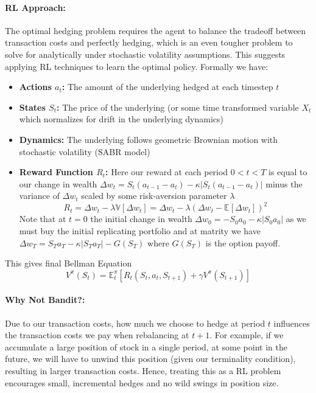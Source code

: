 \documentclass{article}
\begin{document}
\paragraph{RL Approach:} The optimal hedging problem requires the agent to balance the tradeoff between transaction costs and perfectly hedging, which is an even tougher problem to solve for analytically under stochastic volatility assumptions. This suggests applying RL techniques to learn the optimal policy. Formally we have: 
\begin{itemize}
    \item \textbf{Actions $a_t$:} The amount of the underlying hedged at each timestep $t$\cite{halperin}\cite{stoiljkovic}
    \item \textbf{States $S_t$:} The price of the underlying (or some time transformed variable $X_t$ which normalizes for drift in the underlying dynamics)\cite{halperin}\cite{stoiljkovic}
    \item \textbf{Dynamics:} The underlying follows geometric Brownian motion with stochastic volatility (SABR model)\cite{cao}
    \item \textbf{Reward Function $R_t$:}
    Here our reward at each period $0<t<T$ is equal to our change in wealth $\Delta w_t = S_t(a_{t-1}-a_t)-\kappa|S_t(a_{t-1}-a_t)|$ minus the variance of $\Delta w_t$ scaled by some risk-aversion parameter $\lambda$\cite{kolm}
    \[R_t = \Delta w_t - \lambda\mathbb{V}[\Delta w_t] = \Delta w_t - \lambda(\Delta w_t-\mathbb{E}[\Delta w_t])^2\]
    Note that at $t=0$ the initial change in wealth $\Delta w_0=-S_0a_0-\kappa |S_0a_0|$ as we must buy the initial replicating portfolio and at matrity we have  $\Delta w_T=S_Ta_T-\kappa |S_Ta_T|-G(S_T)$ where $G(S_T)$ is the option payoff.
\end{itemize}
This gives final Bellman Equation \[V^{\pi}(S_t) = \mathbb{E}^{\pi}_t[R_t(S_t,a_t,S_{t+1})+\gamma V^{\pi}(S_{t+1})]\]

\paragraph{Why Not Bandit?:} Due to our transaction costs, how much we choose to hedge at period $t$ influences the transaction costs we pay when rebalancing at $t+1$. For example, if we accumulate a large position of stock in a single period, at some point in the future, we will have to unwind this position (given our terminality condition), resulting in larger transaction costs. Hence, treating this as a RL problem encourages small, incremental hedges and no wild swings in position size.
\end{document}
